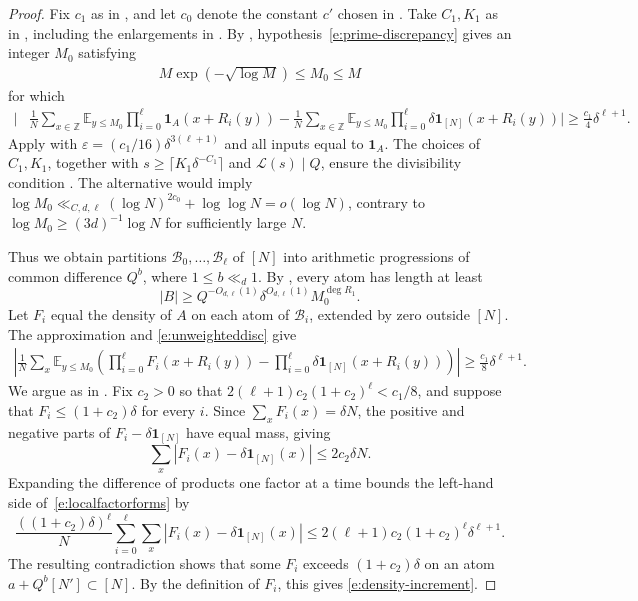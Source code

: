 \documentclass[12pt]{amsart}
\newcommand{\E}{\mathbb E}
\newcommand{\Z}{\mathbb Z}
\newcommand{\1}{\mathbf 1}
\begin{document}
\begin{proof}
Fix $c_1$ as in \cite[Lemma~5.1]{KMTT}, and let $c_0$ denote
the constant $c'$ chosen in \cite[(5.7)]{KMTT}. Take $C_1,K_1$
as in \cite[(5.8)]{KMTT}, including the enlargements in
\cite[(5.35)]{KMTT}.
By \cite[Proposition~5.2, (5.12)]{KMTT},
hypothesis~\eqref{e:prime-discrepancy} gives an integer $M_0$
satisfying
\begin{align}\label{e:m0}
     M\exp(-\sqrt{\log M})\leq M_0\leq M
\end{align}
for which
\begin{align}\label{e:unweighteddisc}
 \bigg|&\frac1N\sum_{x\in\Z}\E_{y\leq M_0}
 \prod_{i=0}^{\ell}\1_A(x+R_i(y))-\frac1N\sum_{x\in\Z}\E_{y\leq M_0}
 \prod_{i=0}^{\ell}\delta\1_{[N]}(x+R_i(y))
 \bigg|
 \geq \frac{c_1}{4}\delta^{\ell+1}.
\end{align}
Apply \cite[Lemma~5.3]{KMTT} with
$\varepsilon=(c_1/16)\delta^{3(\ell+1)}$ and all inputs equal to $\1_A$. The choices of $C_1,K_1$, together with
$s\geq\lceil K_1\delta^{-C_1}\rceil$ and $\mathcal L(s)\mid Q$,
ensure the divisibility condition \cite[(5.25)]{KMTT}.
The alternative \cite[(5.26)]{KMTT}
would imply
$\log M_0\ll_{C,d,\ell}(\log N)^{2c_0}+\log\log N=o(\log N)$,
contrary to $\log M_0\geq(3d)^{-1}\log N$ for sufficiently
large $N$.

Thus we obtain partitions $\mathcal B_0,\ldots,\mathcal B_\ell$
of $[N]$ into arithmetic progressions of common difference
$Q^b$, where $1\leq b\ll_d1$. By \cite[(5.28)]{KMTT},
every atom has length at least
\begin{equation}\label{e:resbound}
 |B|\geq Q^{-O_{d,\ell}(1)}
 \delta^{O_{d,\ell}(1)}M_0^{\deg R_1}.
\end{equation}
Let $F_i$ equal the density of $A$ on each atom of
$\mathcal B_i$, extended by zero outside $[N]$.
The approximation \cite[(5.27)]{KMTT} and \eqref{e:unweighteddisc} give
\begin{align}\label{e:localfactorforms}
 \left|\frac1N\sum_x\E_{y\leq M_0}
 \left(
 \prod_{i=0}^{\ell}F_i(x+R_i(y))
 -
 \prod_{i=0}^{\ell}\delta\1_{[N]}(x+R_i(y))
 \right)\right|
 \geq\frac{c_1}{8}\delta^{\ell+1}.
\end{align}
We argue as in \cite[proof of Lemma~5.4, immediately after
(5.43)]{KMTT}. Fix $c_2>0$ so that
$2(\ell+1)c_2(1+c_2)^\ell<c_1/8$, and suppose that
$F_i\leq(1+c_2)\delta$ for every $i$.
Since $\sum_xF_i(x)=\delta N$, the positive and negative
parts of $F_i-\delta\1_{[N]}$ have equal mass, giving
$$\sum_x|F_i(x)-\delta\1_{[N]}(x)|\leq2c_2\delta N.$$
Expanding the difference of products one factor at a time
bounds the left-hand side of~\eqref{e:localfactorforms} by
\[
 \frac{((1+c_2)\delta)^\ell}N
 \sum_{i=0}^{\ell}\sum_x
 |F_i(x)-\delta\1_{[N]}(x)|
 \leq2(\ell+1)c_2(1+c_2)^\ell\delta^{\ell+1}.
\]
The resulting contradiction shows that some $F_i$ exceeds
$(1+c_2)\delta$ on an atom $a+Q^b[N']\subset[N]$.
By the definition of $F_i$, this gives
\eqref{e:density-increment}.


\end{proof}
\end{document}
